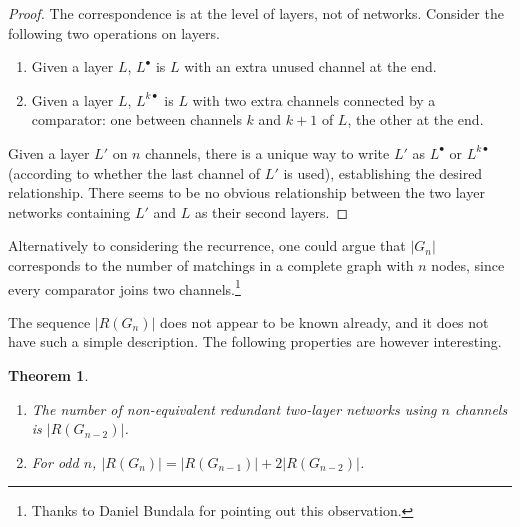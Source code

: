 \documentclass[10pt]{IEEEtran}
\newtheorem{theorem}{Theorem}
\begin{document}
\begin{proof}
  The correspondence is at the level of layers, not of networks.  Consider the
  following two operations on layers.
  \begin{enumerate}
  \item Given a layer $L$, $L^\bullet$ is $L$ with an extra unused channel
    at the end.
  \item Given a layer $L$, $L^{k\bullet}$ is $L$ with two extra channels connected
    by a comparator: one between channels $k$ and $k+1$ of $L$, the other at the
    end.
  \end{enumerate}
  Given a layer $L'$ on $n$ channels, there is a unique way to write $L'$ as
  $L^\bullet$ or $L^{k\bullet}$ (according to whether the last channel of $L'$ is
  used), establishing the desired relationship.
There seems to be no obvious relationship between the two layer networks
  containing $L'$ and $L$ as their second layers.
\end{proof}\bigskip

Alternatively to considering the recurrence, one could argue that $|G_n|$ corresponds to the number of matchings in a complete graph with $n$ nodes, since every comparator joins two channels.\footnote{Thanks to Daniel Bundala for pointing out this observation.}

The sequence $|R(G_n)|$ does not appear to be known already, and it does not have
such a simple description.  The following properties are however interesting.

\begin{theorem}\mbox{}\label{thm:interesting}
  \begin{enumerate}
  \item The number of non-equivalent redundant two-layer networks using $n$
    channels is $|R(G_{n-2})|$.
  \item For odd $n$, $\left|R(G_n)\right|=\left|R(G_{n-1})\right|+2\left|R(G_{n-2})\right|$.
  \end{enumerate}
\end{theorem}
\end{document}
